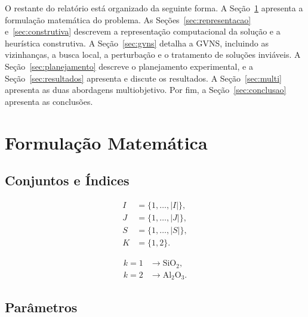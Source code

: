 \documentclass[conference]{IEEEtran}
\begin{document}
O restante do relatório está organizado da seguinte forma. A Seção~\ref{sec:formulacao} apresenta a formulação matemática do problema. As Seções~\ref{sec:representacao} e~\ref{sec:construtiva} descrevem a representação computacional da solução e a heurística construtiva. A Seção~\ref{sec:gvns} detalha a GVNS, incluindo as vizinhanças, a busca local, a perturbação e o tratamento de soluções inviáveis. A Seção~\ref{sec:planejamento} descreve o planejamento experimental, e a Seção~\ref{sec:resultados} apresenta e discute os resultados. A Seção~\ref{sec:multi} apresenta as duas abordagens multiobjetivo. Por fim, a Seção~\ref{sec:conclusao} apresenta as conclusões.

\section{Formulação Matemática}\label{sec:formulacao}

\subsection{Conjuntos e Índices}

\begin{align}
I &= \{1,\ldots,|I|\}, \\
J &= \{1,\ldots,|J|\}, \\
S &= \{1,\ldots,|S|\}, \\
K &= \{1,2\}.
\end{align}

\begin{align}
k=1 &\rightarrow \mathrm{SiO_2}, \\
k=2 &\rightarrow \mathrm{Al_2O_3}.
\end{align}

\subsection{Parâmetros}
\end{document}
